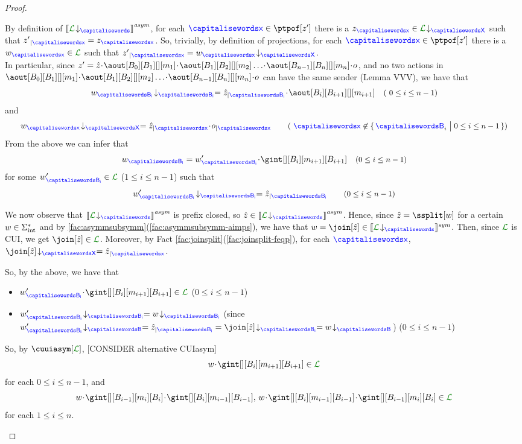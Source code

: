 \begin{proof}
\begin{description}
 By definition of $\asem{\proj{\clang}{}}$, 
for each 
$\px\in\ptpof[{z'}]$  there is a $z_{\px}\in\proj{\clang}{X}$ such that
$\filter{z'}{\px}=z_{\px}$. So, trivially, by definition of projections,
for each $\px\in\ptpof[z']$  there is a $\acword_{\px}\in{\clang}$ such that
$\filter{z'}{\px}=\proj{\acword_{\px}}{X}$.\\
 In particular,
 since $z'=\hat z \cat\aout[B_0][B_1][][m_1]\cat\aout[B_1][B_2][][m_2]\ldots\cat\aout[B_{n-1}][B_n][][m_n]\cat o$, and no two actions in $\aout[B_0][B_1][][m_1]\cat\aout[B_1][B_2][][m_2]\ldots\cat\aout[B_{n-1}][B_n][][m_n]\cat o$ can have the same sender (Lemma VVV), we have that 
  $$
   \proj{\acword_{\ptp[B_{i}]}}{B_{i}}= \filter{\hat z}{\ptp[B_{i}]}\cat\aout[B_{i}][B_{i+1}][][m_{i+1}]
  \quad \text{\small ( $0\leq i \leq n-1$)}$$
  and
  $$\proj{\acword_{\px}}{X} = \filter{\hat z}{\px}\cat  \filter{o}{\px} \qquad 
   \text{\small ( $\px\not\in\Set{\q_i \sst 0\leq i\leq n-1}$)}$$
From the above  we can infer that  
$$
\acword_{\ptp[B_{i}]} = \acword'_{\ptp[B_{i}]}\cat \gint[][{B_i}][m_{i+1}][{B_{i+1}}]
 \quad \text{\small ($0\leq i \leq n-1$)}
$$
      for some $\acword'_{\ptp[B_{i}]} \in\clang$ ($1\leq i \leq n-1$) such that
$$
 \proj{\acword'_{\ptp[B_{i}]}}{B_i}= \filter{\hat z}{\ptp[B_{i}]}  \qquad \text{\small ($0\leq i \leq n-1$)} $$

 We now observe that  $\asem{\proj{\clang}{}}$ is prefix closed, 
so $\hat z\in \asem{\proj{\clang}{}}$. 
Hence, since $\hat z = \ssplit[\acword]$ for a certain $w\in\Sigma_{\text{int}}^*$ and by  
\cref{fac:asymmsubsymm}(\ref{fac:asymmsubsymm-aimps}), we have that
$\acword=\join[\hat z]\in\ssem{\proj{\clang}{}}$. Then,
since $\clang$ is CUI, we get $\join[\hat z]\in\clang$. 
Moreover, by Fact \ref{fac:joinsplit}(\ref{fac:joinsplit-feqp}), for each $\px$,
$\proj{\join[\hat z]}{X}=\filter{\hat z}{\px}$. 


So, by the above, we have that
\begin{itemize}
\item
$\acword'_{\ptp[B_{i}]}\cat\gint[][B_i][m_{i+1}][B_{i+1}]\in\clang$   \qquad  
     {\small  ($0\leq i \leq n-1$)} 
\item
$\proj{\acword'_{\ptp[B_{i}]}}{B_i} = \proj{\acword}{B_i}$\quad 
{\small (since $\proj{\acword'_{\ptp[B_{i}]}}{B}=\filter{\hat z}{\ptp[B_{i}]}=\proj{\join[\hat z]}{B_i}=\proj{\acword}{B}$) \quad ($0\leq i \leq n-1$) }
\end{itemize} 
So, by $\cuuiasym[\clang]$,  [CONSIDER alternative CUIasym]
$$\acword\cat\gint[][B_i][m_{i+1}][{B_{i+1}}]
\in\clang$$
for each $0\leq i \leq n-1$,
and
$$\acword\cat\gint[][B_{i-1}][m_{i}][{B_{i}}]\cat \gint[][{B_{i}}][m_{i-1}][B_{i-1}],\,%
\acword\cat \gint[][{B_{i}}][m_{i-1}][B_{i-1}]\cat\gint[][B_{i-1}][m_{i}][{B_{i}}]%
\in\clang$$
for each $1\leq i \leq n$.


\end{description}
\end{proof}
